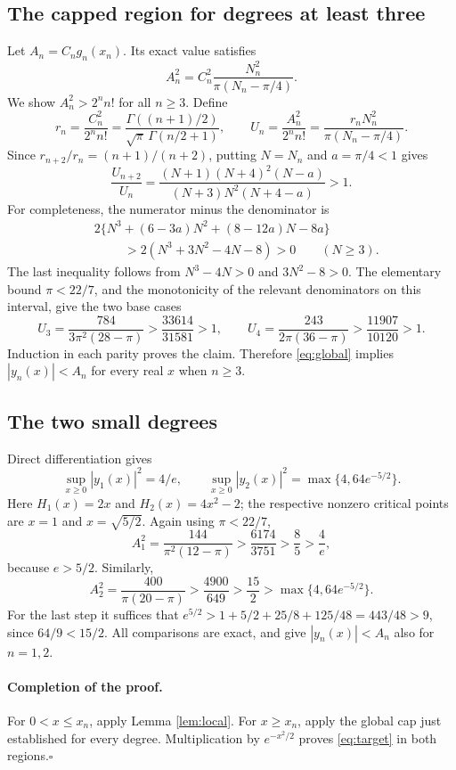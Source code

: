\documentclass[11pt]{article}
\begin{document}
\subsection*{The capped region for degrees at least three}
Let $A_n=C_ng_n(x_n)$. Its exact value satisfies
\[
 A_n^2=C_n^2\frac{N_n^2}{\pi(N_n-\pi/4)}.
\]
We show $A_n^2>2^nn!$ for all $n\ge3$. Define
\[
 r_n=\frac{C_n^2}{2^nn!}
 =\frac{\Gamma((n+1)/2)}{\sqrt\pi\,\Gamma(n/2+1)},\qquad
 U_n=\frac{A_n^2}{2^nn!}
 =\frac{r_nN_n^2}{\pi(N_n-\pi/4)}.
\]
Since $r_{n+2}/r_n=(n+1)/(n+2)$, putting $N=N_n$ and $a=\pi/4<1$
gives
\[
 \frac{U_{n+2}}{U_n}
 =\frac{(N+1)(N+4)^2(N-a)}{(N+3)N^2(N+4-a)}>1.
\]
For completeness, the numerator minus the denominator is
\begin{align*}
 &2\{N^3+(6-3a)N^2+(8-12a)N-8a\}\\
 &\hspace{1cm}>2(N^3+3N^2-4N-8)>0\qquad(N\ge3).
\end{align*}
The last inequality follows from $N^3-4N>0$ and $3N^2-8>0$.
The elementary bound $\pi<22/7$, and the monotonicity of the relevant
denominators on this interval, give the two base cases
\[
 U_3=\frac{784}{3\pi^2(28-\pi)}
     >\frac{33614}{31581}>1,\qquad
 U_4=\frac{243}{2\pi(36-\pi)}
     >\frac{11907}{10120}>1.
\]
Induction in each parity proves the claim. Therefore \eqref{eq:global}
implies $|y_n(x)|<A_n$ for every real $x$ when $n\ge3$.

\subsection*{The two small degrees}
Direct differentiation gives
\[
 \sup_{x\ge0}|y_1(x)|^2=4/e,\qquad
 \sup_{x\ge0}|y_2(x)|^2=\max\{4,64e^{-5/2}\}.
\]
Here $H_1(x)=2x$ and $H_2(x)=4x^2-2$; the respective nonzero
critical points are $x=1$ and $x=\sqrt{5/2}$.
Again using $\pi<22/7$,
\[
 A_1^2=\frac{144}{\pi^2(12-\pi)}>
 \frac{6174}{3751}>\frac85>\frac4e,
\]
because $e>5/2$. Similarly,
\[
 A_2^2=\frac{400}{\pi(20-\pi)}>
 \frac{4900}{649}>\frac{15}{2}>\max\{4,64e^{-5/2}\}.
\]
For the last step it suffices that
$e^{5/2}>1+5/2+25/8+125/48=443/48>9$, since $64/9<15/2$.
All comparisons are exact, and give $|y_n(x)|<A_n$ also for $n=1,2$.

\paragraph{Completion of the proof.}
For $0<x\le x_n$, apply Lemma \ref{lem:local}. For $x\ge x_n$, apply
the global cap just established for every degree. Multiplication by
$e^{-x^2/2}$ proves \eqref{eq:target} in both regions.\hfill$\square$
\end{document}
